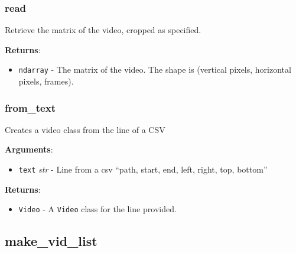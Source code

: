 \subsubsection{read}

\begin{Shaded}
\begin{Highlighting}[]
 \OperatorTok{|}
\end{Highlighting}
\end{Shaded}

Retrieve the matrix of the video, cropped as specified.

\textbf{Returns}:

\begin{itemize}
\tightlist
\item
  \texttt{ndarray} - The matrix of the video. The shape is (vertical
  pixels, horizontal pixels, frames).
\end{itemize}

\subsubsection{from\_text}

\begin{Shaded}
\begin{Highlighting}[]
 \OperatorTok{|} 
 \OperatorTok{|}
\end{Highlighting}
\end{Shaded}

Creates a video class from the line of a CSV

\textbf{Arguments}:

\begin{itemize}
\tightlist
\item
  \texttt{text} \emph{str} - Line from a csv ``path, start, end, left,
  right, top, bottom''
\end{itemize}

\textbf{Returns}:

\begin{itemize}
\tightlist
\item
  \texttt{Video} - A \texttt{Video} class for the line provided.
\end{itemize}

\subsection{make\_vid\_list}

